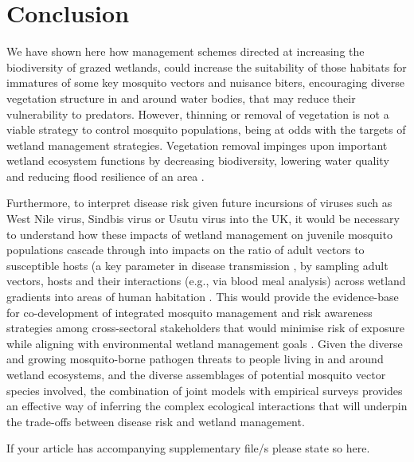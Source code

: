 \documentclass[lineno,sn-basic]{sn-jnl}%
\begin{document}
\section{Conclusion}

We have shown here how management schemes directed at increasing the biodiversity of grazed wetlands, could increase the suitability of those habitats for immatures of some key mosquito vectors and nuisance biters, encouraging diverse vegetation structure in and around water bodies, that may reduce their vulnerability to predators. However, thinning or removal of vegetation is not a viable strategy to control mosquito populations, being at odds with the targets of wetland management strategies. Vegetation removal impinges upon important wetland ecosystem functions by decreasing biodiversity, lowering water quality and reducing flood resilience of an area \citep{acremanTradeoffEcosystemServices2011, rochlinEffectsIntegratedMarsh2012}.

Furthermore, to interpret disease risk given future incursions of viruses such as West Nile virus, Sindbis virus or Usutu virus into the UK, it would be necessary to understand how these impacts of wetland management on juvenile mosquito populations cascade through into impacts on the ratio of adult vectors to susceptible hosts (a key parameter in disease transmission \citep{smithRiskMosquitoBorneInfectionin2004a}, by sampling adult vectors, hosts and their interactions (e.g., via blood meal analysis) across wetland gradients into areas of human habitation \citep{hanfordManagementUrbanWetlands2020}. This would provide the evidence-base for co-development of integrated mosquito management and risk awareness strategies among cross-sectoral stakeholders that would minimise risk of exposure while aligning with environmental wetland management goals \citep{martinouCallArmsSetting2020}. Given the diverse and growing mosquito-borne pathogen threats to people living in and around wetland ecosystems, and the diverse assemblages of potential mosquito vector species involved, the combination of joint models with empirical surveys provides an effective way of inferring the complex ecological interactions that will underpin the trade-offs between disease risk and wetland management.

\backmatter


If your article has accompanying supplementary file/s please state so here. 

\end{document}
